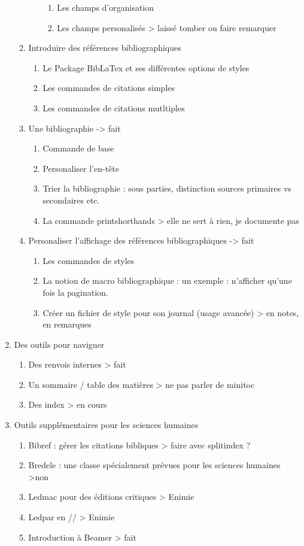 \begin{enumerate}
\begin{enumerate}
\begin{enumerate}
\begin{enumerate}
			\item Les champs d'organisation
			\item Les champs personalisés				> laissé tomber ou faire remarquer
		\end{enumerate} 
	\end{enumerate}
\item{Introduire des références bibliographiques}
	\begin{enumerate}
	\item Le Package BibLaTex et ses différentes options de styles
	\item Les commandes de citations simples
	\item Les commandes de citations mutltiples
	\end{enumerate}
\item Une bibliographie							-> fait
	\begin{enumerate}
	\item Commande de base
	\item Personaliser l'en-tête
	\item Trier la bibliographie : sous parties, distinction sources primaires vs secondaires etc.
	\item La commande printshorthands				> elle ne sert à rien, je documente pas
	\end{enumerate}

\item Personaliser l'affichage des références bibliographiques	-> fait
	\begin{enumerate}
	\item Les commandes de styles
	\item La notion de macro bibliographique : un exemple : n'afficher qu'une fois la pagination.
	\item Créer un fichier de style pour son journal (usage avancée)	> en notes, en remarques
	\end{enumerate}	
\end{enumerate}

\item Des outils pour naviguer
\begin{enumerate}
\item Des renvois internes					> fait
\item Un sommaire / table des matières			> ne pas parler de minitoc
\item Des index							> en cours
\end{enumerate}

\item Outils supplémentaires pour les sciences humaines
\begin{enumerate}
\item Bibref : gérer les citations bibliques			> faire avec splitindex ?
\item Bredele : une classe spécialement prévues pour les sciences humaines >non
\item Ledmac pour des éditions critiques			> Enimie	
\item Ledpar en //							> Enimie
\item Introduction à Beamer					> fait
\end{enumerate}


\end{enumerate}
